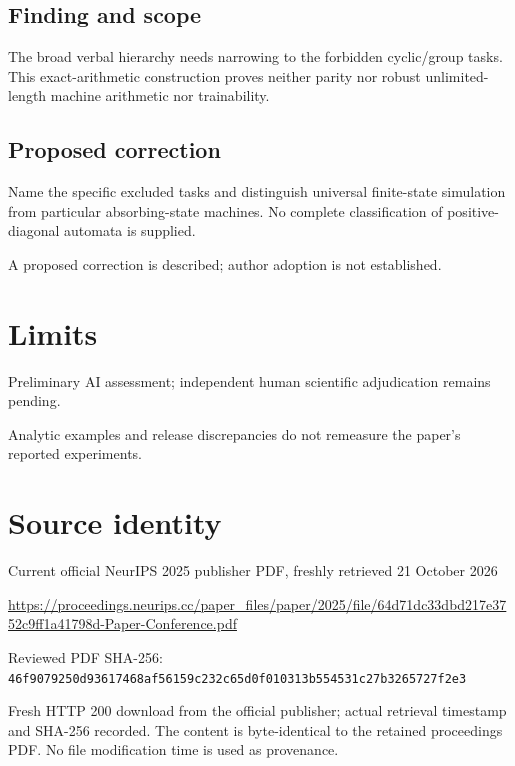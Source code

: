 \documentclass[11pt]{article}
\begin{document}
\subsection*{Finding and scope}

The broad verbal hierarchy needs narrowing to the forbidden cyclic/group tasks. This exact-arithmetic construction proves neither parity nor robust unlimited-length machine arithmetic nor trainability.

\subsection*{Proposed correction}

Name the specific excluded tasks and distinguish universal finite-state simulation from particular absorbing-state machines. No complete classification of positive-diagonal automata is supplied.

A proposed correction is described; author adoption is not established.

\section*{Limits}

Preliminary AI assessment; independent human scientific adjudication remains pending.\par

Analytic examples and release discrepancies do not remeasure the paper’s reported experiments.\par

\section*{Source identity}

Current official NeurIPS 2025 publisher PDF, freshly retrieved 21 October 2026

\url{https://proceedings.neurips.cc/paper_files/paper/2025/file/64d71dc33dbd217e3752c9ff1a41798d-Paper-Conference.pdf}

Reviewed PDF SHA-256: \nolinkurl{46f9079250d93617468af56159c232c65d0f010313b554531c27b3265727f2e3}

Fresh HTTP 200 download from the official publisher; actual retrieval timestamp and SHA-256 recorded. The content is byte-identical to the retained proceedings PDF. No file modification time is used as provenance.
\end{document}
